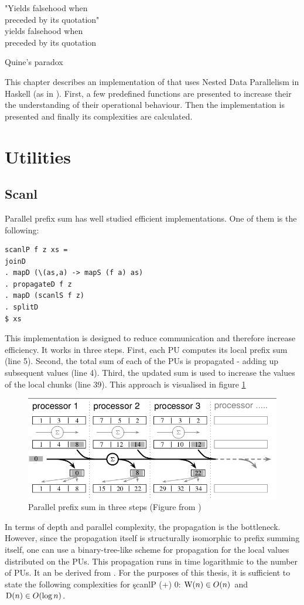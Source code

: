 \epigraph{
"Yields falsehood when \\ preceded by its quotation" \\
yields falsehood when \\ preceded by its quotation
}{
Quine's paradox
}


This chapter describes an implementation of \algo that uses
Nested Data Parallelism in Haskell (as in \cite{Harness2008}).
First, a few predefined functions are presented to
increase their the understanding of their operational behaviour.
Then the implementation is presented
and finally its complexities are calculated.

\section{Utilities}

  \subsection*{Scanl}
    Parallel prefix sum has well studied efficient implementations.
    One of them is the following:
    \begin{lstlisting}   
scanlP f z xs =
joinD
. mapD (\(as,a) -> mapS (f a) as)
. propagateD f z
. mapD (scanlS f z)
. splitD
$ xs
    \end{lstlisting}
    This implementation is designed to reduce communication
    and therefore increase efficiency. It works in three steps.
    First, each PU computes its local prefix sum (line 5).
    Second, the total sum of each of the PUs is propagated
    - adding up subsequent values (line 4).
    Third, the updated sum is used to increase the values of the local chunks (line 39).
    This approach is visualised in figure \ref{figure:scanlPsteps}
    
    \begin{figure}[h!]
        \includegraphics[width=\linewidth]{scanlP-three-steps.png}
        \caption[Three-Step Parallel Prefix Sum]{Parallel prefix sum in three steps (Figure from \cite{DistTypes1999}) }
        \label{figure:scanlPsteps}
    \end{figure}
    In terms of depth and parallel complexity, the propagation is the bottleneck.
    However, since the propagation itself is structurally isomorphic to prefix summing itself,
    one can use a binary-tree-like scheme for propagation for the local values distributed on the PUs.
    This propagation runs in time logarithmic to the number of PUs.
    It an be derived from \cite{Scanl1980}. For the purposes of this thesis,
    it is sufficient to state the following complexities for \c{scanlP (+) 0}:
    $\textrm{W}(n) \in O(n)$ and $\textrm{D}(n) \in O(\log n)$.

